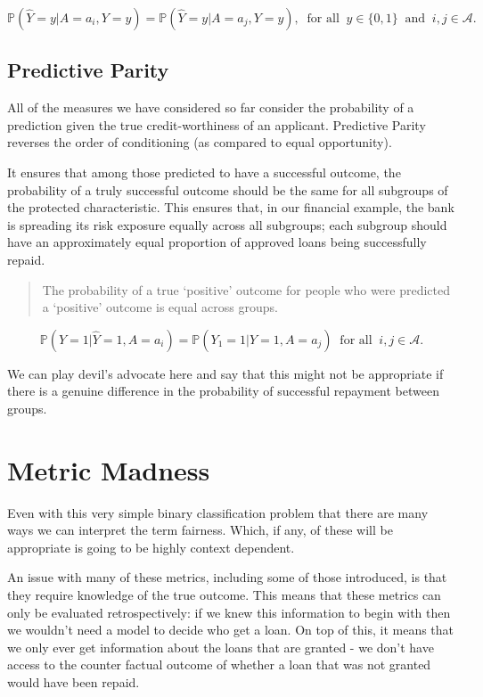 \documentclass[
  12pt,
]{book}
\begin{document}
\[\mathbb{P}(\hat Y = y | A = a_i, Y =y) = \mathbb{P}( \hat Y = y | A = a_j, Y=y), \ \text{ for all } \ y \in \{0,1\} \ \text{ and } \  i,j \in \mathcal{A}.\]

\hypertarget{predictive-parity}{%
\subsection{Predictive Parity}\label{predictive-parity}}

All of the measures we have considered so far consider the probability of a prediction given the true credit-worthiness of an applicant. Predictive Parity reverses the order of conditioning (as compared to equal opportunity).

It ensures that among those predicted to have a successful outcome, the probability of a truly successful outcome should be the same for all subgroups of the protected characteristic. This ensures that, in our financial example, the bank is spreading its risk exposure equally across all subgroups; each subgroup should have an approximately equal proportion of approved loans being successfully repaid.

\begin{quote}
The probability of a true `positive' outcome for people who were predicted a `positive' outcome is equal across groups.
\end{quote}

\[\mathbb{P}(Y = 1 | \hat Y = 1, A = a_i) = \mathbb{P}(Y_1 = 1 | \hat Y = 1, A = a_j) \ \text{ for all } \  i,j \in \mathcal{A}.\]

We can play devil's advocate here and say that this might not be appropriate if there is a genuine difference in the probability of successful repayment between groups.

\hypertarget{metric-madness}{%
\section{Metric Madness}\label{metric-madness}}

Even with this very simple binary classification problem that there are many ways we can interpret the term fairness. Which, if any, of these will be appropriate is going to be highly context dependent.

An issue with many of these metrics, including some of those introduced, is that they require knowledge of the true outcome. This means that these metrics can only be evaluated retrospectively: if we knew this information to begin with then we wouldn't need a model to decide who get a loan. On top of this, it means that we only ever get information about the loans that are granted - we don't have access to the counter factual outcome of whether a loan that was not granted would have been repaid.
\end{document}
